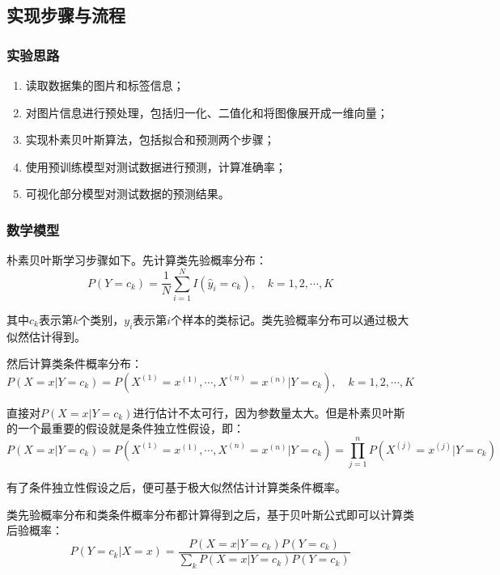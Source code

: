 \documentclass[12pt]{article}
\begin{document}
\subsection{实现步骤与流程}
\subsubsection{实验思路}
\begin{enumerate}
  \item 读取数据集的图片和标签信息；
  \item 对图片信息进行预处理，包括归一化、二值化和将图像展开成一维向量；
  \item 实现朴素贝叶斯算法，包括拟合和预测两个步骤；
  \item 使用预训练模型对测试数据进行预测，计算准确率；
  \item 可视化部分模型对测试数据的预测结果。
\end{enumerate}

\subsubsection{数学模型}

朴素贝叶斯学习步骤如下。先计算类先验概率分布：
\begin{equation}
  P(Y = c_k) = \frac{1}{N} \sum_{i=1}^{N} I(\hat{y}_i = c_k), \quad k = 1,2,\cdots,K
\end{equation}

其中$c_k$表示第$k$个类别，$y_i$表示第$i$个样本的类标记。类先验概率分布可以通过极大似然估计得到。

然后计算类条件概率分布：
\begin{equation}
  P(X = x | Y = c_k) = P(X^{(1)} = x^{(1)}, \cdots, X^{(n)} = x^{(n)} | Y = c_k), \quad k = 1,2,\cdots,K
\end{equation}

直接对$P(X = x | Y = c_k)$进行估计不太可行，因为参数量太大。但是朴素贝叶斯的一个最重要的假设就是条件独立性假设，即：
\begin{equation}
  P(X = x | Y = c_k) = P(X^{(1)} = x^{(1)}, \cdots, X^{(n)} = x^{(n)} | Y = c_k) = \prod_{j=1}^{n} P(X^{(j)} = x^{(j)} | Y = c_k)
\end{equation}

有了条件独立性假设之后，便可基于极大似然估计计算类条件概率。

类先验概率分布和类条件概率分布都计算得到之后，基于贝叶斯公式即可以计算类后验概率：
\begin{equation}
  P(Y = c_k | X = x) = \frac{P(X = x | Y = c_k) P(Y = c_k)}{\sum_{k} P(X = x | Y = c_k) P(Y = c_k)}
\end{equation}
\end{document}
